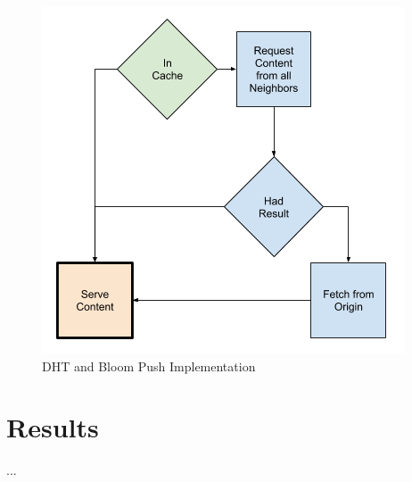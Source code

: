 \documentclass[conference]{IEEEtran}
\begin{document}
\begin{figure}[!h]
	\centering
	\includegraphics[width=0.49\columnwidth]{figures/cache_logic_before.png}
	\caption{DHT and Bloom Push Implementation}
\end{figure}

\section{Results}\label{sec:results}
...
\end{document}
